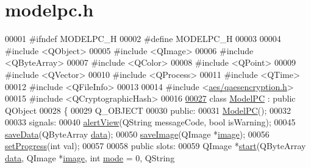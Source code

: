 \hypertarget{modelpc_8h_source}{}\section{modelpc.\+h}
\label{modelpc_8h_source}

\begin{DoxyCode}
00001 \textcolor{preprocessor}{#ifndef MODELPC\_H}
00002 \textcolor{preprocessor}{#define MODELPC\_H}
00003 
00004 \textcolor{preprocessor}{#include <QObject>}
00005 \textcolor{preprocessor}{#include <QImage>}
00006 \textcolor{preprocessor}{#include <QByteArray>}
00007 \textcolor{preprocessor}{#include <QColor>}
00008 \textcolor{preprocessor}{#include <QPoint>}
00009 \textcolor{preprocessor}{#include <QVector>}
00010 \textcolor{preprocessor}{#include <QProcess>}
00011 \textcolor{preprocessor}{#include <QTime>}
00012 \textcolor{preprocessor}{#include <QFileInfo>}
00013 
00014 \textcolor{preprocessor}{#include <\mbox{\hyperlink{qaesencryption_8h}{aes/qaesencryption.h}}>}
00015 \textcolor{preprocessor}{#include <QCryptographicHash>}
00016 
\mbox{\hyperlink{class_model_p_c}{00027}} \textcolor{keyword}{class }\mbox{\hyperlink{class_model_p_c}{ModelPC}} : \textcolor{keyword}{public} QObject
00028 \{
00029     Q\_OBJECT
00030 \textcolor{keyword}{public}:
00031     \mbox{\hyperlink{class_model_p_c_ae12ebe65ec973c02a0de4850a7c1e31c}{ModelPC}}();
00032 
00033 signals:
00040     \mbox{\hyperlink{class_model_p_c_aef1f058227af54e4cfc9fc4c4397d30c}{alertView}}(QString messageCode, \textcolor{keywordtype}{bool} isWarning);
00045     \mbox{\hyperlink{class_model_p_c_a67c4fd6db2cd4a3bb23a2fc48f7cceff}{saveData}}(QByteArray \mbox{\hyperlink{namespace_errors_dict_setup_af570460846fb9f0c91abd308a095dcdc}{data}});
00050     \mbox{\hyperlink{class_model_p_c_a5af79bd5fd50d7be0646778bc99413b9}{saveImage}}(QImage *\mbox{\hyperlink{namespacetests-setup_ad55b685280f549e15688a94cbb89f512}{image}});
00056     \mbox{\hyperlink{class_model_p_c_a25a4496e129e87ac96f12257a123b84f}{setProgress}}(\textcolor{keywordtype}{int} val);
00057 
00058 \textcolor{keyword}{public} slots:
00059     QImage *\mbox{\hyperlink{class_model_p_c_a3cae34fd5bcb06e8c1f8cfe7961bd270}{start}}(QByteArray \mbox{\hyperlink{namespace_errors_dict_setup_af570460846fb9f0c91abd308a095dcdc}{data}}, QImage *\mbox{\hyperlink{namespacetests-setup_ad55b685280f549e15688a94cbb89f512}{image}}, \textcolor{keywordtype}{int} \mbox{\hyperlink{namespacetests-setup_a04126d10edec6b3171e1b55a00309b23}{mode}} = 0, QString 

\end{DoxyCode}
